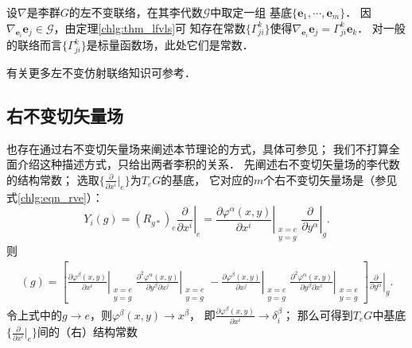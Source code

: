 设$\nabla$是李群$G$的左不变联络，在其李代数$\mathscr{G}$中取定一组
基底$\{\boldsymbol{e}_1,\cdots,\boldsymbol{e}_m\}$．
因$\nabla_{\boldsymbol{e}_i} \boldsymbol{e}_j \in \mathscr{G}$，由定理\ref{chlg:thm_lfvls}可
知存在{\kaishu 常数}$\{\Gamma^k_{ji}\}$使得$\nabla_{\boldsymbol{e}_i} \boldsymbol{e}_j= \Gamma^k_{ji} \boldsymbol{e}_k$．
对一般的联络而言$\{\Gamma^k_{ji}\}$是标量函数场，此处它们是{\kaishu 常数}．

有关更多左不变仿射联络知识可参考\parencite[\S 2.1.3]{helgason-2001}．






\subsection{右不变切矢量场}
也存在通过右不变切矢量场来阐述本节理论的方式，具体可参见\parencite[\S 6.1]{cc2001-zh}；
我们不打算全面介绍这种描述方式，只给出两者李积的关系．
先阐述右不变切矢量场的李代数的结构常数；
选取$\{\frac{\partial}{\partial x^i}|_{e}\}$为$T_eG$的基底，
它对应的$m$个右不变切矢量场是（参见式\eqref{chlg:eqn_rve}）：
\begin{equation}
    Y_i(g)=(R_{g*})_e \left. \frac{\partial }{\partial x^i }\right|_{e}
    = \left. \frac{\partial \varphi^\alpha (x,y)}{\partial x^i} 
    \right|_{\substack{x=e\\y=g}}   \left. \frac{\partial}{\partial y^\alpha}\right|_{g} .
\end{equation}
则 
\begin{align*}
    [Y_i, Y_j](g)= \left[ \left. \frac{\partial \varphi^\beta (x,y)}{\partial x^i} \right|_{\substack{x=e\\y=g}}
    \left. \frac{\partial^2 \varphi^\alpha (x,y)}{\partial y^\beta \partial x^j} \right|_{\substack{x=e\\y=g}} 
    - \left. \frac{\partial \varphi^\beta (x,y)}{\partial x^j} \right|_{\substack{x=e\\y=g}}
    \left. \frac{\partial^2 \varphi^\alpha (x,y)}{\partial y^\beta \partial x^i} \right|_{\substack{x=e\\y=g}} 
    \right] \left. \frac{\partial}{\partial y^\alpha}\right|_{g} .
\end{align*} %
令上式中的$g\to e$，则$\varphi^\beta(x,y) \to x^\beta$，
即$\frac{\partial \varphi^\beta (x,y)}{\partial x^i}\to \delta^\beta_i$；
那么可得到$T_eG$中基底$\{\frac{\partial}{\partial x^i}|_{e}\}$间的（右）结构常数
